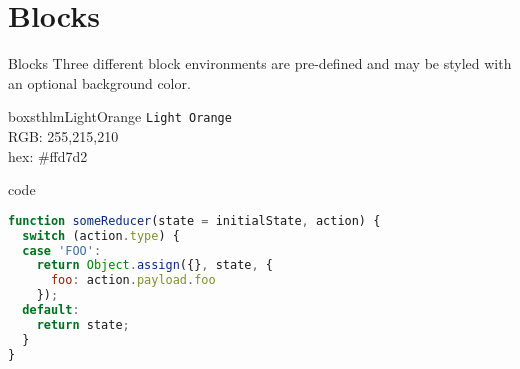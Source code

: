 \documentclass{beamer}
\begin{document}
\section{Blocks}
\begin{frame}{Blocks}
Three different block environments are pre-defined and may be styled with an
optional background color.

\begin{beamercolorbox}[wd=\linewidth,ht=10ex,dp=3ex]{boxsthlmLightOrange}
\centering
\texttt{Light Orange}\\
\vspace{1em}
\tiny{RGB:  255,215,210} \\
\tiny{hex: \#ffd7d2}
\end{beamercolorbox}
\end{frame}

\begin{frame}[fragile]{code}
\begin{lstlisting}[language=JavaScript, caption=My Javascript Example]
function someReducer(state = initialState, action) {
  switch (action.type) {
  case 'FOO':
    return Object.assign({}, state, {
      foo: action.payload.foo
    });
  default:
    return state;
  }
}
\end{lstlisting}
\end{frame}
\end{document}

